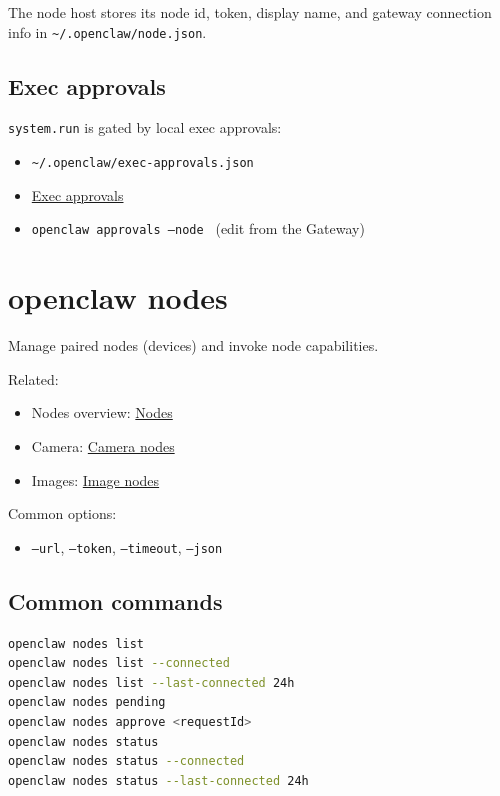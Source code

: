 The node host stores its node id, token, display name, and gateway connection info in
\texttt{\textasciitilde{}/.openclaw/node.json}.

\subsection{Exec approvals}


\texttt{system.run} is gated by local exec approvals:

\begin{itemize}
  \item \texttt{\textasciitilde{}/.openclaw/exec-approvals.json}
  \item \href{/tools/exec-approvals}{Exec approvals}
  \item \texttt{openclaw approvals --node } (edit from the Gateway)
\end{itemize}



\clearpage

\section{openclaw nodes}


Manage paired nodes (devices) and invoke node capabilities.

Related:

\begin{itemize}
  \item Nodes overview: \href{/nodes}{Nodes}
  \item Camera: \href{/nodes/camera}{Camera nodes}
  \item Images: \href{/nodes/images}{Image nodes}
\end{itemize}


Common options:

\begin{itemize}
  \item \texttt{--url}, \texttt{--token}, \texttt{--timeout}, \texttt{--json}
\end{itemize}


\subsection{Common commands}


\begin{lstlisting}[language=bash]
openclaw nodes list
openclaw nodes list --connected
openclaw nodes list --last-connected 24h
openclaw nodes pending
openclaw nodes approve <requestId>
openclaw nodes status
openclaw nodes status --connected
openclaw nodes status --last-connected 24h
\end{lstlisting}


